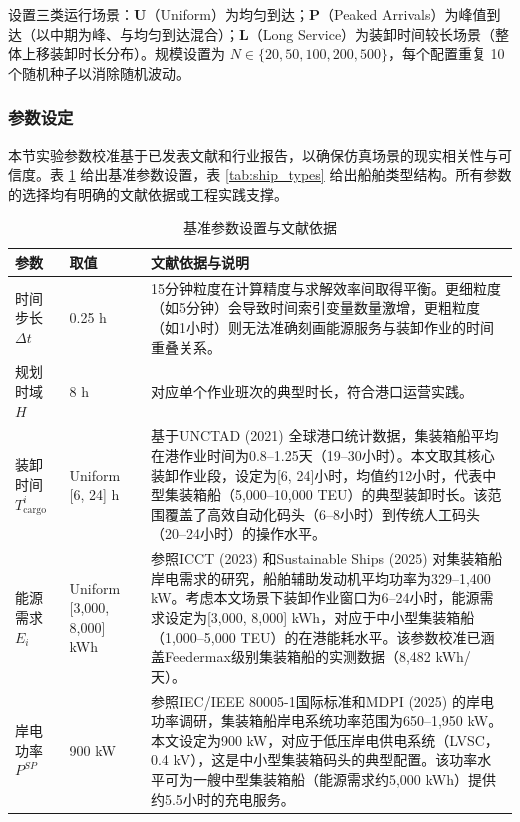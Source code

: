 \documentclass[UTF8, a4paper, 12pt]{ctexart}
\begin{document}
设置三类运行场景：\textbf{U}（Uniform）为均匀到达；\textbf{P}（Peaked Arrivals）为峰值到达（以中期为峰、与均匀到达混合）；\textbf{L}（Long Service）为装卸时间较长场景（整体上移装卸时长分布）。规模设置为 $N\in\{20,50,100,200,500\}$，每个配置重复 10 个随机种子以消除随机波动。

\subsubsection{参数设定}
\label{sec:parameter_setting}

本节实验参数校准基于已发表文献和行业报告，以确保仿真场景的现实相关性与可信度。表 \ref{tab:exp_params} 给出基准参数设置，表 \ref{tab:ship_types} 给出船舶类型结构。所有参数的选择均有明确的文献依据或工程实践支撑。

\begin{table}[htbp]
    \centering
    \caption{基准参数设置与文献依据}
    \label{tab:exp_params}
    \scriptsize
    \renewcommand{\arraystretch}{1.3}
    \begin{threeparttable}
    \begin{tabular}{p{3.2cm} p{2cm} p{9cm}}
        \toprule
        \textbf{参数} & \textbf{取值} & \textbf{文献依据与说明} \\
        \midrule
        时间步长 $\Delta t$ & 0.25 h & 15分钟粒度在计算精度与求解效率间取得平衡。更细粒度（如5分钟）会导致时间索引变量数量激增，更粗粒度（如1小时）则无法准确刻画能源服务与装卸作业的时间重叠关系。 \\
        \addlinespace
        规划时域 $H$ & 8 h & 对应单个作业班次的典型时长，符合港口运营实践。 \\
        \addlinespace
        装卸时间 $T_{\text{cargo}}^i$ & Uniform [6, 24] h & 基于UNCTAD (2021) \cite{UNCTAD2021}全球港口统计数据，集装箱船平均在港作业时间为0.8--1.25天（19--30小时）。本文取其核心装卸作业段，设定为[6, 24]小时，均值约12小时，代表中型集装箱船（5,000--10,000 TEU）的典型装卸时长。该范围覆盖了高效自动化码头（6--8小时）到传统人工码头（20--24小时）的操作水平。 \\
        \addlinespace
        能源需求 $E_i$ & Uniform [3,000, 8,000] kWh & 参照ICCT (2023) \cite{ICCT2023}和Sustainable Ships (2025) \cite{SustainableShips2025}对集装箱船岸电需求的研究，船舶辅助发动机平均功率为329--1,400 kW。考虑本文场景下装卸作业窗口为6--24小时，能源需求设定为[3,000, 8,000] kWh，对应于中小型集装箱船（1,000--5,000 TEU）的在港能耗水平。该参数校准已涵盖Feedermax级别集装箱船的实测数据（8,482 kWh/天）。 \\
        \addlinespace
        岸电功率 $P^{SP}$ & 900 kW & 参照IEC/IEEE 80005-1国际标准\cite{IEC80005}和MDPI (2025) \cite{MDPI2025}的岸电功率调研，集装箱船岸电系统功率范围为650--1,950 kW。本文设定为900 kW，对应于低压岸电供电系统（LVSC，0.4 kV），这是中小型集装箱码头的典型配置。该功率水平可为一艘中型集装箱船（能源需求约5,000 kWh）提供约5.5小时的充电服务。 \\

\end{tabular}
\end{threeparttable}
\end{table}
\end{document}
